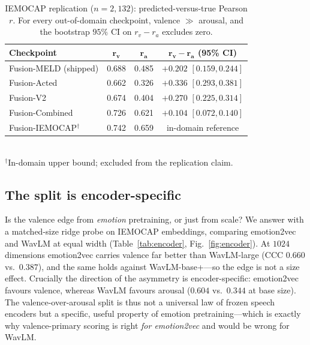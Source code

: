 \documentclass[conference]{IEEEtran}
\begin{document}
\begin{table}[t]
\caption{IEMOCAP replication ($n=2{,}132$): predicted-versus-true Pearson $r$. For
every out-of-domain checkpoint, valence $\gg$ arousal, and the bootstrap $95\%$
CI on $r_v - r_a$ excludes zero.}
\label{tab:iemocap}
\centering
\setlength{\tabcolsep}{4pt}
\renewcommand{\arraystretch}{1.2}
\begin{tabular}{|l|c|c|c|}
\hline
\textbf{Checkpoint} & $\mathbf{r_v}$ & $\mathbf{r_a}$ & $\mathbf{r_v-r_a}$ \textbf{(95\% CI)} \\
\hline
Fusion-MELD (shipped) & 0.688 & 0.485 & $+0.202$ $[0.159,0.244]$ \\
\hline
Fusion-Acted          & 0.662 & 0.326 & $+0.336$ $[0.293,0.381]$ \\
\hline
Fusion-V2             & 0.674 & 0.404 & $+0.270$ $[0.225,0.314]$ \\
\hline
Fusion-Combined       & 0.726 & 0.621 & $+0.104$ $[0.072,0.140]$ \\
\hline
Fusion-IEMOCAP$^{\dagger}$ & 0.742 & 0.659 & in-domain reference \\
\hline
\end{tabular}
\\[3pt]
{\footnotesize $^{\dagger}$In-domain upper bound; excluded from the replication claim.}
\end{table}

\subsection{The split is encoder-specific}
Is the valence edge from \emph{emotion} pretraining, or just from scale? We answer
with a matched-size ridge probe on IEMOCAP embeddings, comparing emotion2vec and
WavLM at equal width (Table~\ref{tab:encoder}, Fig.~\ref{fig:encoder}). At $1024$
dimensions emotion2vec carries valence far better than WavLM-large (CCC $0.660$
vs.\ $0.387$), and the same holds against WavLM-base+---so the edge is not a size
effect. Crucially the direction of the asymmetry is encoder-specific: emotion2vec
favours valence, whereas WavLM favours arousal ($0.604$ vs.\ $0.344$ at base
size). The valence-over-arousal split is thus not a universal law of frozen speech
encoders but a specific, useful property of emotion pretraining---which is exactly
why valence-primary scoring is right \emph{for emotion2vec} and would be wrong for
WavLM.
\end{document}
